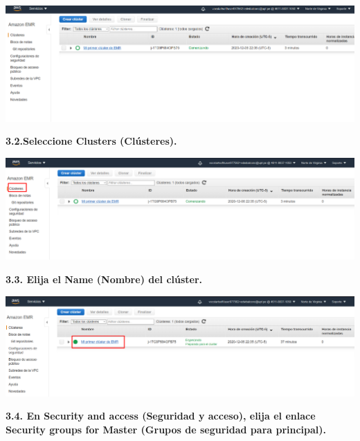 \documentclass{article}
\begin{document}
    \begin{center}
		\includegraphics[width=15cm]{./images/10} 
	\end{center}
	\newpage
\textbf{3.2.Seleccione Clusters (Clústeres). }

    \begin{center}
		\includegraphics[width=15cm]{./images/11} 
	\end{center}
\textbf{3.3. Elija el Name (Nombre) del clúster. 
}

    \begin{center}
		\includegraphics[width=15cm]{./images/12} 
	\end{center}

\newpage
\textbf{3.4. En Security and access (Seguridad y acceso), elija el enlace Security groups for Master (Grupos de
seguridad para principal).
}
\end{document}
